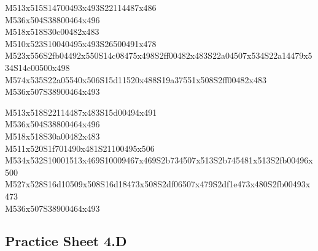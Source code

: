 \documentclass{article}
\begin{document}
\begin{multicols}{5}
\begin{center}
M513x515S14700493x493S22114487x486 %
\\M536x504S38800464x496 %
\\M518x518S30c00482x483 %
\\M510x523S10040495x493S26500491x478 %
\\M523x556S2fb04492x550S14c08475x498S2ff00482x483S22a04507x534S22a14479x534S14c00500x498 %
\\M574x535S22a05540x506S15d11520x488S19a37551x508S2ff00482x483 %
\\M536x507S38900464x493 %
\vfil
\columnbreak

M513x518S22114487x483S15d00494x491 %
\\M536x504S38800464x496 %
\\M518x518S30a00482x483 %
\\M511x520S1f701490x481S21100495x506 %
\\M534x532S10001513x469S10009467x469S2b734507x513S2b745481x513S2fb00496x500 %
\\M527x528S16d10509x508S16d18473x508S2df06507x479S2df1e473x480S2fb00493x473 %
\\M536x507S38900464x493 %
\vfil

\end{center}
\end{multicols}

\subsection{Practice Sheet 4.D}
\end{document}
